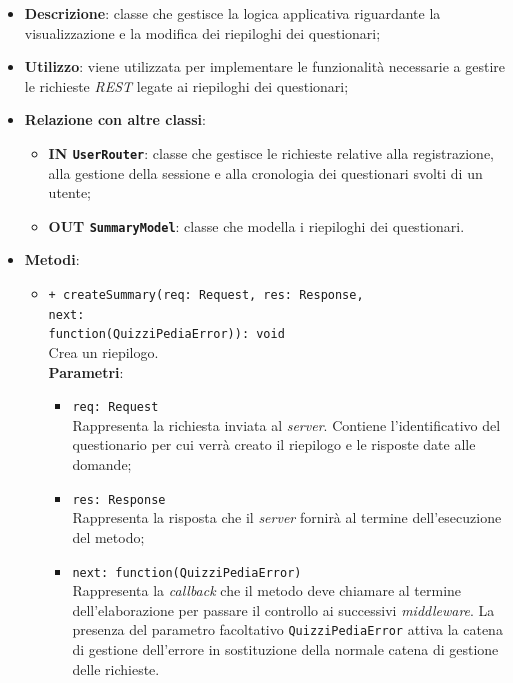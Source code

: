 \begin{itemize}
	\item \textbf{Descrizione}:
	classe che gestisce la logica applicativa riguardante la visualizzazione e la modifica dei riepiloghi dei questionari;
	\item \textbf{Utilizzo}:
	viene utilizzata per implementare le funzionalità necessarie a gestire le richieste \textit{REST} legate ai riepiloghi dei questionari;
	\item \textbf{Relazione con altre classi}:
	\begin{itemize}
			\item \textbf{IN \texttt{UserRouter}}:
			classe che gestisce le richieste relative alla registrazione, alla gestione della sessione e alla cronologia dei questionari svolti di un utente;
			\item \textbf{OUT \texttt{SummaryModel}}:
			classe che modella i riepiloghi dei questionari.
	\end{itemize}
	\item \textbf{Metodi}:
	\begin{itemize}
		\item \texttt{+ createSummary(req: Request, res: Response, \\next: \\function(QuizziPediaError)): void}\\
		Crea un riepilogo.\\
		\textbf{Parametri}:
		\begin{itemize}
			\item \texttt{req: Request}\\
			Rappresenta la richiesta inviata al \textit{server}. Contiene l'identificativo del questionario per cui verrà creato il riepilogo e le risposte date alle domande;
			\item \texttt{res: Response}\\
			Rappresenta la risposta che il \textit{server} fornirà al termine dell'esecuzione del metodo;
			\item \texttt{next: function(QuizziPediaError)}\\
			Rappresenta la \textit{callback} che il metodo deve chiamare al termine dell'elaborazione per passare il controllo ai successivi \textit{middleware}. La presenza del parametro facoltativo \texttt{QuizziPediaError} attiva la catena di gestione dell'errore in sostituzione della normale catena di gestione delle richieste.
		\end{itemize}
	\end{itemize}
\end{itemize}